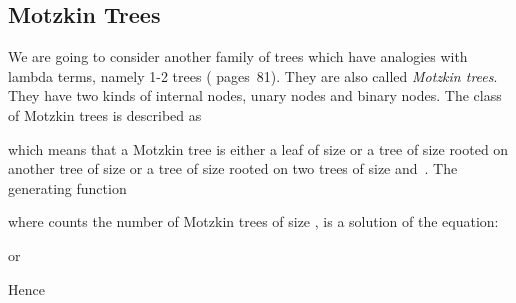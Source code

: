 \documentclass{sig-alternate}
\begin{document}
\subsection{Motzkin Trees}
\label{sec:MotzTrees}

We are going to consider another family of trees which have analogies with lambda
terms, namely 1-2 trees (\cite{flajolet08:_analy_combin} pages~81). They are also
called \emph{Motzkin trees}. They have two kinds of internal nodes, unary nodes and
binary nodes.  The class of Motzkin trees is described as

which means that a Motzkin tree is either a leaf of size  or a tree of size 
rooted on another tree of size  or a tree of size  rooted on two
trees of size  and~.  The generating function 

where  counts the number of Motzkin trees of size , is a solution of the
equation:

or


Hence
\end{document}
